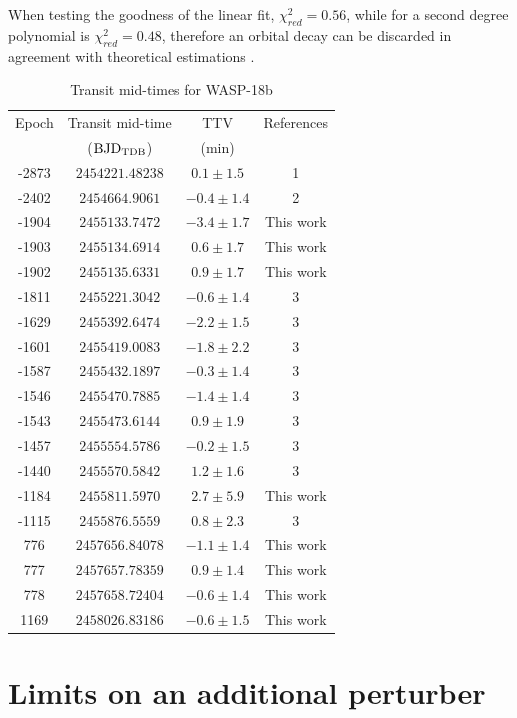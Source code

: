 When testing the goodness of the linear fit, $\chi^{2}_{red} =0.56$, while for a second degree polynomial is $\chi^{2}_{red}=0.48$, therefore an orbital decay can be discarded in agreement with theoretical estimations \citep{CollierCameron2018}.  


\begin{table}[H]
\centering
\caption{Transit mid-times for WASP-18b}
\label{times_wasp18}
\begin{tabular}{cccc}
\hline \hline
Epoch & Transit mid-time & TTV & References\\
      & (${\rm BJD_{TDB}}$) & (min) & \\
\hline 
-2873 & $2454221.48238$ & $0.1\pm1.5$ & 1\\
-2402 & $2454664.9061$ & $-0.4\pm1.4$ & 2 \\
-1904 & $2455133.7472$ & $-3.4\pm1.7$ & This work \\
-1903 & $2455134.6914$ & $0.6\pm1.7$ & This work \\
-1902 & $2455135.6331$  & $0.9\pm1.7$  & This work \\
-1811 & $2455221.3042$ & $-0.6\pm1.4$  & 3\\
-1629 & $2455392.6474$ & $-2.2\pm1.5$& 3 \\
-1601 & $2455419.0083$ & $-1.8\pm2.2$& 3\\
-1587 & $2455432.1897$ & $-0.3\pm1.4$ & 3\\
-1546 & $2455470.7885$ & $-1.4\pm1.4$ & 3\\
-1543 & $2455473.6144$ & $0.9\pm1.9$& 3\\
-1457 & $2455554.5786$ & $-0.2\pm1.5$&3 \\
-1440 & $2455570.5842$ & $1.2\pm1.6$& 3\\
-1184 & $2455811.5970$ &  $2.7\pm5.9$ & This work  \\
-1115 & $2455876.5559$ & $0.8\pm2.3$ & 3 \\ 
776 & $2457656.84078$ & $-1.1\pm1.4$ & This work  \\
777 & $2457657.78359$   & $0.9\pm1.4$ & This work\\
778 & $2457658.72404$ & $-0.6\pm1.4$ & This work \\
1169 & $2458026.83186$ & $-0.6\pm1.5$ & This work  \\
\hline
\end{tabular}
\end{table} 

\section{Limits on an additional perturber}

